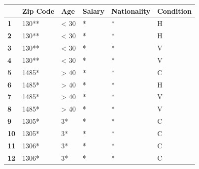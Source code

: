 \documentclass[a4paper,12pt]{article}
\begin{document}
\begin{table}[!ht]
    \centering
    \begin{tabular}{|l|l|l|l|l|l|}
        \hline
        \textbf{}   & \textbf{Zip Code} & \textbf{Age} & \textbf{Salary} & \textbf{Nationality} & \textbf{Condition} \\ \hline
        \rowcolor{green!60}
        \textbf{1}  & 130**             & < 30         & *               & *                    & H                  \\ \hline
        \rowcolor{green!60}
        \textbf{2}  & 130**             & < 30         & *               & *                    & H                  \\ \hline
        \rowcolor{green!60}
        \textbf{3}  & 130**             & < 30         & *               & *                    & V                  \\ \hline
        \rowcolor{green!60}
        \textbf{4}  & 130**             & < 30         & *               & *                    & V                  \\ \hline
        \rowcolor{blue!60}
        \textbf{5}  & 1485*             & > 40         & *               & *                    & C                  \\ \hline
        \rowcolor{blue!60}
        \textbf{6}  & 1485*             & > 40         & *               & *                    & H                  \\ \hline
        \rowcolor{blue!60}
        \textbf{7}  & 1485*             & > 40         & *               & *                    & V                  \\ \hline
        \rowcolor{blue!60}
        \textbf{8}  & 1485*             & > 40         & *               & *                    & V                  \\ \hline
        \rowcolor{yellow!60}
        \textbf{9}  & 1305*             & 3*           & *               & *                    & C                  \\ \hline
        \rowcolor{yellow!60}
        \textbf{10} & 1305*             & 3*           & *               & *                    & C                  \\ \hline
        \rowcolor{red!60}
        \textbf{11} & 1306*             & 3*           & *               & *                    & C                  \\ \hline
        \rowcolor{red!60}
        \textbf{12} & 1306*             & 3*           & *               & *                    & C                  \\ \hline
    \end{tabular}
\end{table}
\end{document}
